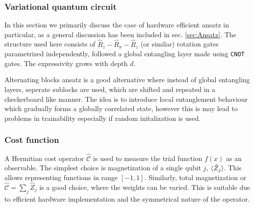 \documentclass[11pt,a4paper]{article}
\begin{document}
\subsubsection{Variational quantum circuit}

In this section we primarily discuss the case of hardware efficient ansatz in particular, as a general discussion has been included in sec. \ref{sec:Ansatz}. The structure used here consists of $\hat{R}_z - \hat{R}_x - \hat{R}_z$ (or similar) rotation gates parametrized independently, followed a global entangling layer made using \texttt{CNOT} gates. The expressivity grows with depth $d$.

Alternating blocks ansatz is a good alternative where instead of global entangling layers, seperate sublocks are used, which are shifted and repeated in a checkerboard like manner. The idea is to introduce local entanglement behaviour which gradually forms a globally correlated state, however this is may lead to problems in trainability especially if random initalization is used.

\subsubsection{Cost function}

A Hermitian cost operator $\mathcal{\hat{C}}$ is used to measure the trial function $f(x)$ as an observable. The simplest choice is magnetization of a single qubit $j$, $\braket{\hat{Z}_j}$. This allows representing functions in range $[-1, 1]$. Similarly, total magnetization or $\mathcal{\hat{C}} = \sum_j \hat{Z}_j$ is a good choice, where the weights can be varied. This is suitable due to efficient hardware implementation and the symmetrical nature of the operator.
\end{document}
